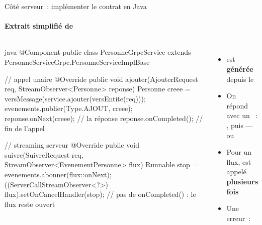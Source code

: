 \documentclass[aspectratio=169,11pt]{beamer}
\begin{document}
\begin{frame}[fragile]{Côté serveur~: implémenter le contrat en Java}
  \framesubtitle{Extrait simplifié de }
  \begin{columns}[T,onlytextwidth]
\begin{codetiny}{java}
@Component
public class PersonneGrpcService
    extends PersonneServiceGrpc.PersonneServiceImplBase {

  // appel unaire
  @Override
  public void ajouter(AjouterRequest req,
                      StreamObserver<Personne> reponse) {
    Personne creee = versMessage(service.ajouter(versEntite(req)));
    evenements.publier(Type.AJOUT, creee);
    reponse.onNext(creee);        // la réponse
    reponse.onCompleted();        // fin de l'appel
  }

  // streaming serveur
  @Override
  public void suivre(SuivreRequest req,
                     StreamObserver<EvenementPersonne> flux) {
    Runnable stop = evenements.abonner(flux::onNext);
    ((ServerCallStreamObserver<?>) flux).setOnCancelHandler(stop);
    // pas de onCompleted() : le flux reste ouvert
  }
}
\end{codetiny}
    \footnotesize
    \begin{itemize}
      \item {} est \textbf{générée} depuis le 
      \item On répond avec un ~: , puis  — ou 
      \item Pour un flux,  est appelé \textbf{plusieurs fois}
      \item Une erreur~:  
    \end{itemize}
  \end{columns}
\end{frame}
\end{document}
